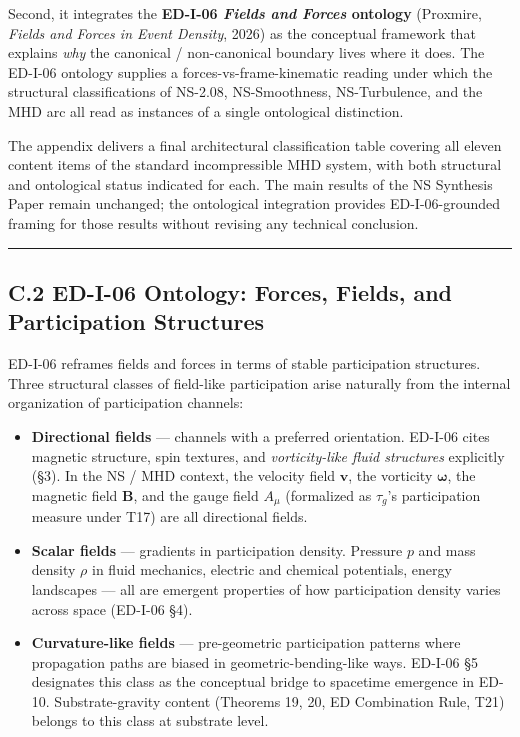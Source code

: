 \documentclass[
  11pt,a4paper]{article}
\providecommand{\tightlist}{%
  \setlength{\itemsep}{0pt}\setlength{\parskip}{0pt}}
\begin{document}
Second, it integrates the \textbf{ED-I-06 \emph{Fields and Forces}
ontology} (Proxmire, \emph{Fields and Forces in Event Density}, 2026) as
the conceptual framework that explains \emph{why} the canonical /
non-canonical boundary lives where it does. The ED-I-06 ontology
supplies a forces-vs-frame-kinematic reading under which the structural
classifications of NS-2.08, NS-Smoothness, NS-Turbulence, and the MHD
arc all read as instances of a single ontological distinction.

The appendix delivers a final architectural classification table
covering all eleven content items of the standard incompressible MHD
system, with both structural and ontological status indicated for each.
The main results of the NS Synthesis Paper remain unchanged; the
ontological integration provides ED-I-06-grounded framing for those
results without revising any technical conclusion.

\begin{center}\rule{0.5\linewidth}{0.5pt}\end{center}

\subsection{C.2 ED-I-06 Ontology: Forces, Fields, and Participation
Structures}\label{c.2-ed-i-06-ontology-forces-fields-and-participation-structures}

ED-I-06 reframes fields and forces in terms of stable participation
structures. Three structural classes of field-like participation arise
naturally from the internal organization of participation channels:

\begin{itemize}
\tightlist
\item
  \textbf{Directional fields} --- channels with a preferred orientation.
  ED-I-06 cites magnetic structure, spin textures, and
  \emph{vorticity-like fluid structures} explicitly (§3). In the NS /
  MHD context, the velocity field \(\mathbf{v}\), the vorticity
  \(\boldsymbol{\omega}\), the magnetic field \(\mathbf{B}\), and the
  gauge field \(A_\mu\) (formalized as \(\tau_g\)'s participation
  measure under T17) are all directional fields.
\item
  \textbf{Scalar fields} --- gradients in participation density.
  Pressure \(p\) and mass density \(\rho\) in fluid mechanics, electric
  and chemical potentials, energy landscapes --- all are emergent
  properties of how participation density varies across space (ED-I-06
  §4).
\item
  \textbf{Curvature-like fields} --- pre-geometric participation
  patterns where propagation paths are biased in geometric-bending-like
  ways. ED-I-06 §5 designates this class as the conceptual bridge to
  spacetime emergence in ED-10. Substrate-gravity content (Theorems 19,
  20, ED Combination Rule, T21) belongs to this class at substrate
  level.
\end{itemize}
\end{document}
